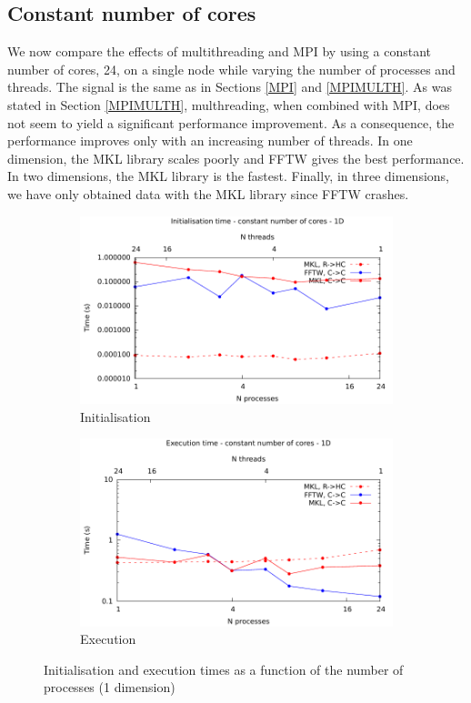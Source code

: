 \documentclass[12pt, a4paper]{article} \setlength{\textheight}{24cm}
\begin{document}
\subsection{Constant number of cores}\label{CONST}
We now compare the effects of multithreading and MPI by using a
constant number of cores, 24, on a single node while varying the
number of processes and threads. The signal is the same as in Sections
\ref{MPI} and \ref{MPIMULTH}. As was stated in Section \ref{MPIMULTH},
multhreading, when combined with MPI, does not seem to yield a
significant performance improvement. As a consequence, the performance
improves only with an increasing number of threads. In one dimension,
the MKL library scales poorly and FFTW gives the best performance. In
two dimensions, the MKL library is the fastest. Finally, in three
dimensions, we have only obtained data with the MKL library since FFTW
crashes.
\begin{figure}[H]
  \captionsetup{width=0.8\linewidth}
  \centering
  \begin{subfigure}{.5\textwidth}
    \centering
    \includegraphics[width=.9\linewidth]{graphs/const-init-1d.pdf}
    \caption{Initialisation}
    \label{1DCONSTI}
  \end{subfigure}%
  \begin{subfigure}{.5\textwidth}
    \centering
    \includegraphics[width=.9\linewidth]{graphs/const-exec-1d.pdf}
    \caption{Execution}
    \label{1DCONSTE}
  \end{subfigure}
  \caption{Initialisation and execution times as a function of the
    number of processes (1 dimension)}
  \label{1DCONST}
\end{figure}
\end{document}

